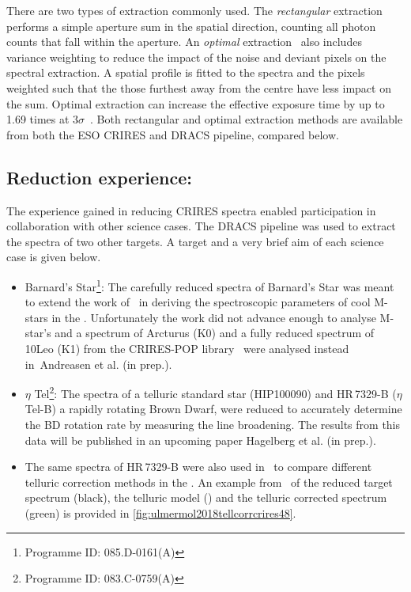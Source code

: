 There are two types of extraction commonly used.
The \emph{rectangular} extraction performs a simple aperture sum in the spatial direction, counting all photon counts that fall within the aperture.
An \emph{optimal} extraction~\citep{horne_optimal_1986} also includes variance weighting to reduce the impact of the noise and deviant pixels on the spectral extraction.
A spatial profile is fitted to the spectra and the pixels weighted such that the those furthest away from the centre have less impact on the sum.
Optimal extraction can increase the effective exposure time by up to 1.69 times at \(3 \sigma\)~\citep{horne_optimal_1986}.
Both rectangular and optimal extraction methods are available from both the {ESO} {CRIRES} and {DRACS} pipeline, compared below.








\subsection{Reduction experience:}
\label{subsec:experience}
The experience gained in reducing {CRIRES} spectra enabled participation in collaboration with other science cases.
The {DRACS} pipeline was used to extract the spectra of two other targets.
A target and a very brief aim of each science case is given below.
\begin{itemize}
\item Barnard's Star\footnote{Programme {{ID}}: 085.D-0161(A)}: The carefully reduced \nir{} spectra of Barnard's Star was meant to extend the work of~\citet{andreasen_nearinfrared_2016} in deriving the spectroscopic parameters of cool M-stars in the \nir{}.
Unfortunately the work did not advance enough to analyse M-star's and a spectrum of {Arcturus} (K0) and a fully reduced spectrum of {10Leo} (K1) from the {CRIRES}-POP library~\cite{nicholls_crirespop_2017} were analysed instead in~{Andreasen et al. (in prep.)}.
\item \(\eta\) Tel\footnote{Programme {{ID}}: 083.C-0759(A)}: The spectra of a telluric standard star (HIP100090) and {HR\,7329-B} (\(\eta\) Tel-B) a rapidly rotating Brown Dwarf, were reduced to accurately determine the BD rotation rate by measuring the line broadening.
The results from this data will be published in an upcoming paper Hagelberg et al. (in prep.).
\item The same spectra of {HR\,7329-B} were also used in~\citet{ulmer-moll_telluric_2018} to compare different telluric correction methods in the \nir{}.
An example from~\citet[][(B.3)]{ulmer-moll_telluric_2018} of the reduced target spectrum (black), the telluric model () and the telluric corrected spectrum (green) is provided in \cref{fig:ulmermol2018tellcorrcrires48}.
\end{itemize}

